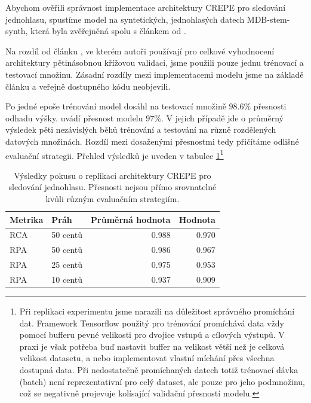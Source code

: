 Abychom ověřili správnost implementace architektury CREPE pro sledování jednohlasu, spustíme model na syntetických, jednohlasých datech MDB-stem-synth, která byla zvěřejněná spolu s článkem od \cite{Salamon2017}.

Na rozdíl od článku \cite{Kim2018}, ve kterém autoři používají pro celkové vyhodnocení architektury pětinásobnou křížovou validaci, jsme použili pouze jednu trénovací a testovací množinu. Zásadní rozdíly mezi implementacemi modelu jsme na základě článku a veřejně dostupného kódu neobjevili.

Po jedné epoše trénování model dosáhl na testovací množině $98.6\%$ přesnosti odhadu výšky. \cite{Kim2018} uvádí přesnost modelu $97\%$. V jejich případě jde o průměrný výsledek pěti nezávislých běhů trénování a testování na různě rozdělených datových množinách. Rozdíl mezi dosaženými přesnostmi tedy přičítáme odlišné evaluační strategii. Přehled výsledků je uveden v tabulce \ref{tab:crepe_replicate}\footnote{Při replikaci experimentu jsme narazili na důležitost správného promíchání dat. Framework Tensorflow použitý pro trénování promíchává data vždy pomocí bufferu pevné velikosti pro dvojice vstupů a cílových výstupů. V praxi je však potřeba buď nastavit buffer na velikost větší než je celková velikost datasetu, a nebo implementovat vlastní míchání přes všechna dostupná data. Při nedostatečně promíchaných datech totiž trénovací dávka (batch) není reprezentativní pro celý dataset, ale pouze pro jeho podmnožinu, což se negativně projevuje kolísající validační přesností modelu.
}

\begin{table}[h!]

\centering
    \begin{tabular}{llrr}
    \toprule
    Metrika & Práh & Průměrná hodnota & Hodnota \cite{Kim2018} \\
    \midrule
    RCA & 50 centů & 0.988 & 0.970 \\
    RPA  & 50 centů & 0.986 & 0.967 \\
    RPA  & 25 centů & 0.975 & 0.953 \\
    RPA  & 10 centů & 0.937 & 0.909 \\
    \bottomrule
    \end{tabular}
\caption{Výsledky pokusu o replikaci architektury CREPE pro sledování jednohlasu. Přesnosti nejsou přímo srovnatelné kvůli různým evaluačním strategiím.}\label{tab:crepe_replicate}

\end{table}

